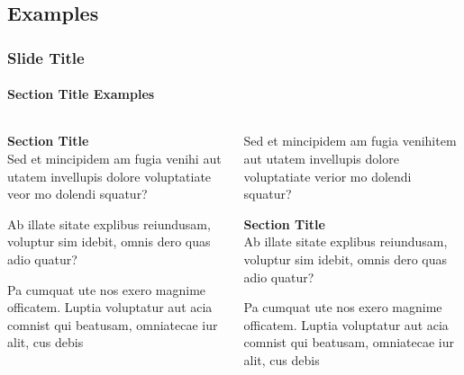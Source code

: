 \documentclass[
	aspectratio=169, %
	t, %
	onlytextwidth, %
	10pt, %
]{beamer}
\begin{document}

\subsection{Examples}

\begin{frame}
	\frametitle{Slide Title}
	\framesubtitle{Section Title Examples}
	
	\begin{columns}[T] %
		\begin{column}{0.48\linewidth} %
			\textbf{Section Title}\\
			Sed et mincipidem am fugia venihi aut utatem invellupis dolore voluptatiate veor mo dolendi squatur?
	
			Ab illate sitate explibus reiundusam, voluptur sim idebit, omnis dero quas adio quatur?
	
			Pa cumquat ute nos exero magnime officatem. Luptia voluptatur aut acia comnist qui beatusam, omniatecae iur alit, cus debis
		\end{column}
		\begin{column}{0.48\linewidth} %
			Sed et mincipidem am fugia venihitem aut utatem invellupis dolore voluptatiate verior mo dolendi squatur?
		
			\textbf{Section Title}\\
			Ab illate sitate explibus reiundusam, voluptur sim idebit, omnis dero quas adio quatur?
			
			Pa cumquat ute nos exero magnime officatem. Luptia voluptatur aut acia comnist qui beatusam, omniatecae iur alit, cus debis
		\end{column}
	\end{columns}
\end{frame}

\end{document}
